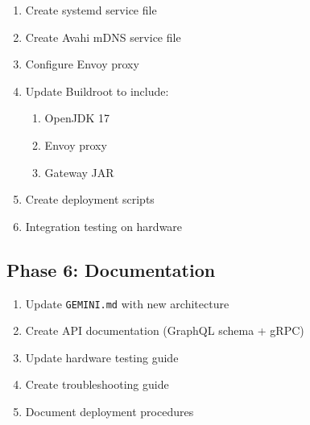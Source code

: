 \begin{enumerate}
    \item[$\square$] Create systemd service file
    \item[$\square$] Create Avahi mDNS service file
    \item[$\square$] Configure Envoy proxy
    \item[$\square$] Update Buildroot to include:
    \begin{enumerate}
        \item[$\square$] OpenJDK 17
        \item[$\square$] Envoy proxy
        \item[$\square$] Gateway JAR
    \end{enumerate}
    \item[$\square$] Create deployment scripts
    \item[$\square$] Integration testing on hardware
\end{enumerate}

\subsection{Phase 6: Documentation}

\begin{enumerate}
    \item[$\square$] Update \texttt{GEMINI.md} with new architecture
    \item[$\square$] Create API documentation (GraphQL schema + gRPC)
    \item[$\square$] Update hardware testing guide
    \item[$\square$] Create troubleshooting guide
    \item[$\square$] Document deployment procedures
\end{enumerate}

